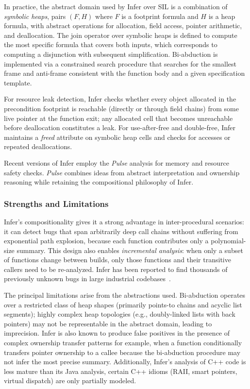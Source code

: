 \documentclass[11pt,a4paper]{article}
\begin{document}
In practice, the abstract domain used by Infer over SIL is a combination of \emph{symbolic heaps}, pairs $(F, H)$ where $F$ is a footprint formula and $H$ is a heap formula, with abstract operations for allocation, field access, pointer arithmetic, and deallocation. The join operator over symbolic heaps is defined to compute the most specific formula that covers both inputs, which corresponds to computing a disjunction with subsequent simplification. Bi-abduction is implemented via a constrained search procedure that searches for the smallest frame and anti-frame consistent with the function body and a given specification template.
	      
For resource leak detection, Infer checks whether every object allocated in the precondition footprint is reachable (directly or through field chains) from some live pointer at the function exit; any allocated cell that becomes unreachable before deallocation constitutes a leak. For use-after-free and double-free, Infer maintains a \emph{freed} attribute on symbolic heap cells and checks for accesses or repeated deallocations.
	      
Recent versions of Infer employ the \emph{Pulse} analysis for memory and resource safety checks. \emph{Pulse} combines ideas from abstract interpretation and ownership reasoning while retaining the compositional philosophy of Infer.
	      
\subsubsection{Strengths and Limitations}
	      
Infer's compositionality gives it a strong advantage in inter-procedural scenarios: it can detect bugs that span arbitrarily deep call chains without suffering from exponential path explosion, because each function contributes only a polynomial-size summary. This design also enables \emph{incremental analysis}: when only a subset of functions change between builds, only those functions and their transitive callers need to be re-analyzed. Infer has been reported to find thousands of previously unknown bugs in large industrial codebases~\cite{calcagno2015}.
	      
The principal limitations arise from the abstractions used. Bi-abduction operates over a restricted class of heap shapes (primarily points-to chains and acyclic list segments); highly complex heap topologies (e.g., doubly-linked lists with back pointers) may not be representable in the abstract domain, leading to imprecision. Infer is also known to produce false positives in the presence of complex ownership transfer patterns for example, when a function conditionally transfers pointer ownership to a callee because the bi-abduction procedure may not infer the most precise summary. Additionally, Infer's analysis of C++ code is less mature than its Java analysis, certain C++ idioms (RAII, smart pointers, virtual dispatch) are only partially modeled.
\end{document}
